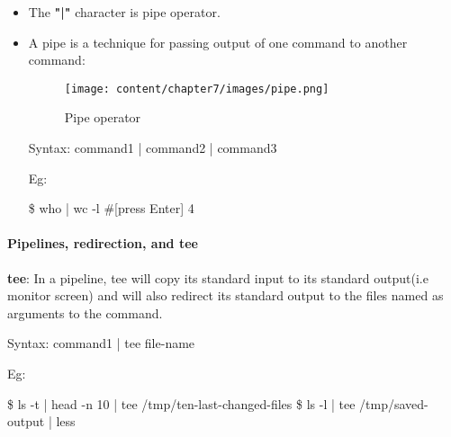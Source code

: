 \setlength{\columnsep}{3pt}
\begin{flushleft}
	\begin{itemize}
		\item The \textbf{"|"} character is pipe operator.
		\item A pipe is a technique for passing output of one command to another command:
		\bigskip
		\bigskip
		\begin{figure}[h!]
			\centering
			\texttt{[image: content/chapter7/images/pipe.png]}
			\caption{Pipe operator}
			\label{fig:pipe_operator}
		\end{figure}

		\bigskip
		\begin{tcolorbox}[breakable,notitle,boxrule=0pt,colback=pink,colframe=pink]
			\color{black}
			\font=9pt
			Syntax: command1 | command2 | command3
			\font=4pt
		\end{tcolorbox}
	
		Eg: 
		\bigskip
		\begin{tcolorbox}[breakable,notitle,boxrule=-0pt,colback=black,colframe=black]
			\color{green}
			\font=9pt
			\$ who | wc -l 			\color{yellow} \#[press Enter]
			\newline
			\color{white}
			4
			\font=4pt
		\end{tcolorbox}
	
	\end{itemize}
	
	\paragraph{Pipelines, redirection, and tee}
	\textbf{tee}: In a pipeline, tee will copy its standard input to its standard output(i.e monitor screen) and will also redirect its standard output to the files named as arguments to the command.
	\begin{tcolorbox}[breakable,notitle,boxrule=0pt,colback=pink,colframe=pink]
		\color{black}
		\font=9pt
		Syntax: command1 | tee file-name
		\font=4pt
	\end{tcolorbox}
	Eg:
	\begin{tcolorbox}[breakable,notitle,boxrule=-0pt,colback=black,colframe=black]
		\color{green}
		\font=9pt
		\$ ls -t | head -n 10 | tee /tmp/ten-last-changed-files
		\newline
		\$ ls -l | tee /tmp/saved-output | less
		\font=4pt
	\end{tcolorbox}
		
	
	
\end{flushleft}

\newpage

